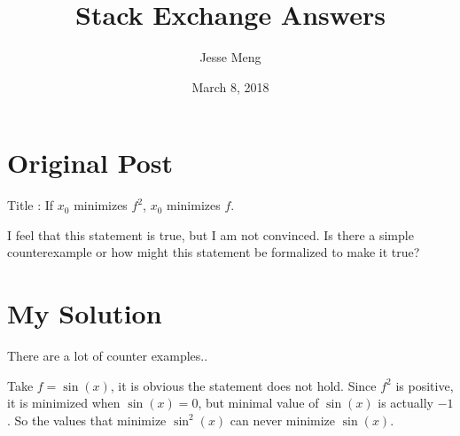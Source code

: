 \documentclass{article}
\title{Stack Exchange Answers}
\author{Jesse Meng }
\date{March 8, 2018}
\begin{document}
\maketitle

\section{Original Post}
Title : If $x_0$ minimizes $f^2$, $x_0$ minimizes $f$.

I feel that this statement is true, but I am not convinced. Is there a simple counterexample or how might this statement be formalized to make it true?
\section{My Solution}
There are a lot of counter examples..

Take $f=\sin(x)$, it is obvious the statement does not hold. Since $f^2$ is positive, it is minimized when $\sin(x)=0$, but minimal value of $\sin(x)$ is actually $-1$. So the values that minimize $\sin^2(x)$ can never minimize $\sin(x)$.
\end{document}
